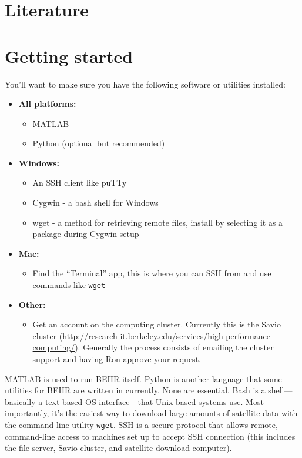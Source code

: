 \documentclass[12pt]{article}
\begin{document}
\section{Literature}

\section{Getting started}

	You'll want to make sure you have the following software or utilities installed:

	\begin{itemize}
		\item \textbf{All platforms:}
		\begin{itemize}
			\item MATLAB
			\item Python (optional but recommended)
		\end{itemize}
		
		\item \textbf{Windows:}
		\begin{itemize}
			\item An SSH client like puTTy
			\item Cygwin - a bash shell for Windows
			\item wget - a method for retrieving remote files, install by selecting it as a package during Cygwin setup
		\end{itemize}
		
		\item \textbf{Mac:}
		\begin{itemize}
			\item Find the ``Terminal'' app, this is where you can SSH from and use commands like \texttt{wget}
		\end{itemize}
		
		\item \textbf{Other:}
		\begin{itemize}
			\item Get an account on the computing cluster. Currently this is the Savio cluster (\url{http://research-it.berkeley.edu/services/high-performance-computing/}). Generally the process consists of emailing the cluster support and having Ron approve your request.
		\end{itemize}
	\end{itemize}
	
	MATLAB is used to run BEHR itself. Python is another language that some utilities for BEHR are written in currently. None are essential. Bash is a shell---basically a text based OS interface---that Unix based systems use. Most importantly, it's the easiest way to download large amounts of satellite data with the command line utility \texttt{wget}. SSH is a secure protocol that allows remote, command-line access to machines set up to accept SSH connection (this includes the file server, Savio cluster, and satellite download computer).
	
\end{document}
